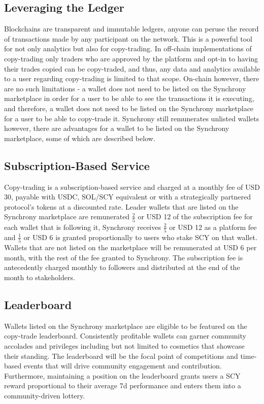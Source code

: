 \documentclass[10pt]{article}
\begin{document}
					\subsection{Leveraging the Ledger}
					Blockchains are transparent and immutable ledgers, anyone can peruse the record
					of transactions made by any participant on the network. This is a powerful tool
					for not only analytics but also for copy-trading. In off-chain implementations
					of copy-trading only traders who are approved by the platform and opt-in to
					having their trades copied can be copy-traded, and thus, any data and analytics
					available to a user regarding copy-trading is limited to that scope. On-chain
					however, there are no such limitations - a wallet does not need to be listed on
					the Synchrony marketplace in order for a user to be able to see the
					transactions it is executing, and therefore, a wallet does not need to be listed
					on the Synchrony marketplace for a user to be able to copy-trade it. Synchrony
					still remunerates unlisted wallets however, there are advantages for a wallet to
					be listed on the Synchrony marketplace, some of which are described below.

					\subsection{Subscription-Based Service}
					Copy-trading is a subscription-based service and charged at a monthly fee of USD
					30, payable with USDC, SOL/SCY equivalent or with a strategically partnered
					protocol's tokens at a discounted rate. Leader wallets that are listed on the
					Synchrony marketplace are remunerated \(\frac{2}{5}\) or USD 12 of the
					subscription fee
					for each wallet that is following it, Synchrony receives \(\frac{2}{5}\) or USD 12 as
					a platform fee and \(\frac{1}{5}\) or USD 6 is granted proportionally to users who stake SCY
					on that wallet. Wallets that are not listed on the marketplace will be
					remunerated at USD 6 per month, with the rest of the fee granted to Synchrony.
					The subscription fee is antecedently charged monthly to followers and
					distributed at the end of the month to stakeholders.

					\subsection{Leaderboard}
					Wallets listed on the Synchrony marketplace are eligible to be featured on the
					copy-trade leaderboard. Consistently profitable wallets can garner community
					accolades and privileges including but not limited to cosmetics that showcase
					their standing. The leaderboard will be the focal point of competitions and
					time-based events that will drive community engagement and contribution.
					Furthermore, maintaining a position on the leaderboard grants users a SCY reward
					proportional to their average 7d performance and enters them into
					a community-driven lottery.
\end{document}
